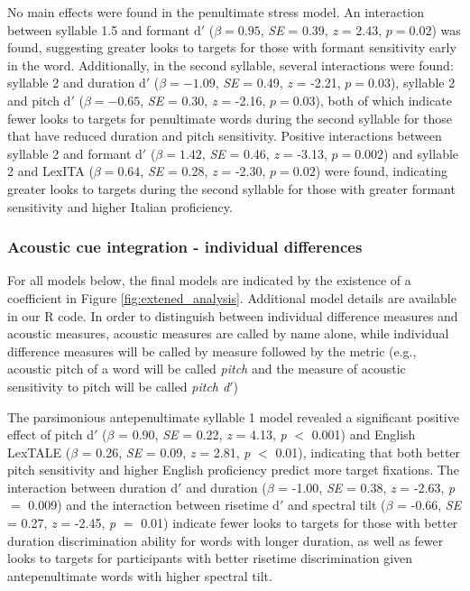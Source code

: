 No main effects were found in the penultimate stress model. An interaction between syllable 1.5 and formant d$'$ ($\beta= 0.95$, \textit{SE} = 0.39, \textit{z} = 2.43, $p = 0.02$) was found, suggesting greater looks to targets for those with formant sensitivity early in the word. Additionally, in the second syllable, several interactions were found: syllable 2 and duration d$'$ ($\beta= -1.09$, \textit{SE} = 0.49, \textit{z} = -2.21, $p = 0.03$), syllable 2 and pitch d$'$ ($\beta= -0.65$, \textit{SE} = 0.30, \textit{z} = -2.16, $p = 0.03$), both of which indicate fewer looks to targets for penultimate words during the second syllable for those that have reduced duration and pitch sensitivity. Positive interactions between syllable 2 and formant d$'$ ($\beta= 1.42$, \textit{SE} = 0.46, \textit{z} = -3.13, $p = 0.002$) and syllable 2 and LexITA ($\beta= 0.64$, \textit{SE} = 0.28, \textit{z} = -2.30, $p = 0.02$) were found, indicating greater looks to targets during the second syllable for those with greater formant sensitivity and higher Italian proficiency. 

\subsubsection{Acoustic cue integration - individual differences}

For all models below, the final models are indicated by the existence of a coefficient in Figure \ref{fig:extened_analysis}. Additional model details are available in our R code. In order to distinguish between individual difference measures and acoustic measures, acoustic measures are called by name alone, while individual difference measures will be called by measure followed by the metric (e.g., acoustic pitch of a word will be called \textit{pitch} and the measure of acoustic sensitivity to pitch will be called \textit{pitch d$'$}) 

The parsimonious antepenultimate syllable 1 model revealed a significant positive effect of pitch d$'$ ($\beta$ = 0.90, \textit{SE} = 0.22, \textit{z} = 4.13, \textit{p} $<$ 0.001) and English LexTALE ($\beta$ = 0.26, \textit{SE} = 0.09, \textit{z} = 2.81, \textit{p} $<$ 0.01), indicating that both better pitch sensitivity and higher English proficiency predict more target fixations. The interaction between duration d$'$ and duration ($\beta$ = -1.00, \textit{SE} = 0.38, \textit{z} = -2.63, \textit{p} $=$ 0.009) and the interaction between risetime d$'$ and spectral tilt ($\beta$ = -0.66, \textit{SE} = 0.27, \textit{z} = -2.45, \textit{p} $=$ 0.01) indicate fewer looks to targets for those with better duration discrimination ability for words with longer duration, as well as fewer looks to targets for participants with better risetime discrimination given antepenultimate words with higher spectral tilt.

